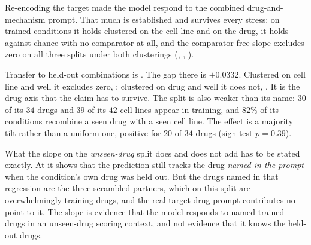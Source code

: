 %
\begin{claim}
Re-encoding the target made the model respond to the combined drug-and-mechanism
prompt. That much is established and survives every stress: on trained
conditions it holds clustered on the cell line and on the drug, it holds against
chance with no comparator at all, and the comparator-free slope excludes zero on
all three splits under both clusterings (,
, ).

Transfer to held-out combinations is \notestablished. The gap there is
$+0.0332$. Clustered on cell line and well it excludes zero,
; clustered on drug and well it does not,
. It is the drug axis that the claim has to
survive. The split is also weaker than its name: $30$ of its $34$ drugs and
$39$ of its $42$ cell lines appear in training, and $82\%$ of its conditions
recombine a seen drug with a seen cell line. The effect is a majority tilt
rather than a uniform one, positive for $20$ of $34$ drugs (sign test
$p = 0.39$).

What the slope on the \emph{unseen-drug} split does and does not add has to be
stated exactly. At  it shows that the prediction
still tracks the drug \emph{named in the prompt} when the condition's own drug was
held out. But the drugs named in that regression are the three scrambled
partners, which on this split are overwhelmingly training drugs, and the real
target-drug prompt contributes no point to it. The slope is evidence that the
model responds to named trained drugs in an unseen-drug scoring context, and not
evidence that it knows the held-out drugs.
\end{claim}
